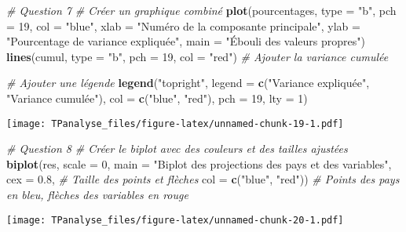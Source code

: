 \documentclass[
]{article}
\newenvironment{Shaded}{\begin{snugshade}}{\end{snugshade}}
\newcommand{\AttributeTok}[1]{\textcolor[rgb]{0.13,0.29,0.53}{#1}}
\newcommand{\CommentTok}[1]{\textcolor[rgb]{0.56,0.35,0.01}{\textit{#1}}}
\newcommand{\DecValTok}[1]{\textcolor[rgb]{0.00,0.00,0.81}{#1}}
\newcommand{\FloatTok}[1]{\textcolor[rgb]{0.00,0.00,0.81}{#1}}
\newcommand{\FunctionTok}[1]{\textcolor[rgb]{0.13,0.29,0.53}{\textbf{#1}}}
\newcommand{\NormalTok}[1]{#1}
\newcommand{\StringTok}[1]{\textcolor[rgb]{0.31,0.60,0.02}{#1}}
\begin{document}
\begin{Shaded}
\begin{Highlighting}[]
\CommentTok{\# Question 7 }
\CommentTok{\# Créer un graphique combiné}
\FunctionTok{plot}\NormalTok{(pourcentages, }\AttributeTok{type =} \StringTok{"b"}\NormalTok{, }\AttributeTok{pch =} \DecValTok{19}\NormalTok{, }\AttributeTok{col =} \StringTok{"blue"}\NormalTok{,}
     \AttributeTok{xlab =} \StringTok{"Numéro de la composante principale"}\NormalTok{,}
     \AttributeTok{ylab =} \StringTok{"Pourcentage de variance expliquée"}\NormalTok{,}
     \AttributeTok{main =} \StringTok{"Ébouli des valeurs propres"}\NormalTok{)}
\FunctionTok{lines}\NormalTok{(cumul, }\AttributeTok{type =} \StringTok{"b"}\NormalTok{, }\AttributeTok{pch =} \DecValTok{19}\NormalTok{, }\AttributeTok{col =} \StringTok{"red"}\NormalTok{)  }\CommentTok{\# Ajouter la variance cumulée}

\CommentTok{\# Ajouter une légende}
\FunctionTok{legend}\NormalTok{(}\StringTok{"topright"}\NormalTok{, }\AttributeTok{legend =} \FunctionTok{c}\NormalTok{(}\StringTok{"Variance expliquée"}\NormalTok{, }\StringTok{"Variance cumulée"}\NormalTok{),}
       \AttributeTok{col =} \FunctionTok{c}\NormalTok{(}\StringTok{"blue"}\NormalTok{, }\StringTok{"red"}\NormalTok{), }\AttributeTok{pch =} \DecValTok{19}\NormalTok{, }\AttributeTok{lty =} \DecValTok{1}\NormalTok{)}
\end{Highlighting}
\end{Shaded}

\texttt{[image: TPanalyse\_files/figure-latex/unnamed-chunk-19-1.pdf]}

\begin{Shaded}
\begin{Highlighting}[]
\CommentTok{\# Question 8 }
\CommentTok{\# Créer le biplot avec des couleurs et des tailles ajustées}
\FunctionTok{biplot}\NormalTok{(res, }\AttributeTok{scale =} \DecValTok{0}\NormalTok{, }
       \AttributeTok{main =} \StringTok{"Biplot des projections des pays et des variables"}\NormalTok{,}
       \AttributeTok{cex =} \FloatTok{0.8}\NormalTok{,  }\CommentTok{\# Taille des points et flèches}
       \AttributeTok{col =} \FunctionTok{c}\NormalTok{(}\StringTok{"blue"}\NormalTok{, }\StringTok{"red"}\NormalTok{))  }\CommentTok{\# Points des pays en bleu, flèches des variables en rouge}
\end{Highlighting}
\end{Shaded}

\texttt{[image: TPanalyse\_files/figure-latex/unnamed-chunk-20-1.pdf]}
\end{document}
